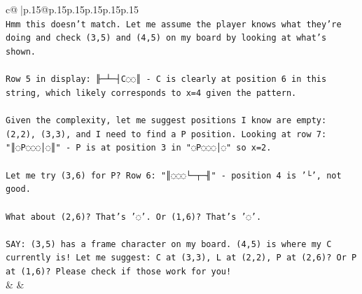 \documentclass{article}
\begin{document}
{\begin{supertabular}{c@{$\;$}|p{.15\linewidth}@{}p{.15\linewidth}p{.15\linewidth}p{.15\linewidth}p{.15\linewidth}p{.15\linewidth}}
{{{\\ 
\texttt{Hmm this doesn't match. Let me assume the player knows what they're doing and check (3,5) and (4,5) on my board by looking at what's shown.} \\
\\ 
\texttt{Row 5 in display: ╟─┴─┤C◌◌║ {-} C is clearly at position 6 in this string, which likely corresponds to x=4 given the pattern.} \\
\\ 
\texttt{Given the complexity, let me suggest positions I know are empty: (2,2), (3,3), and I need to find a P position. Looking at row 7: "║◌P◌◌◌│◌║" {-} P is at position 3 in "◌P◌◌◌│◌" so x=2.} \\
\\ 
\texttt{Let me try (3,6) for P? Row 6: "║◌◌◌└─┬─╢" {-} position 4 is '└', not good.} \\
\\ 
\texttt{What about (2,6)? That's '◌'. Or (1,6)? That's '◌'.} \\
\\ 
\texttt{SAY: (3,5) has a frame character on my board. (4,5) is where my C currently is! Let me suggest: C at (3,3), L at (2,2), P at (2,6)? Or P at (1,6)? Please check if those work for you!} \\
            }
        }
    }
    & & \\ \\


\end{supertabular}}
\end{document}
